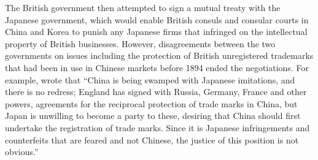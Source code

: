 \documentclass[12pt]{article}
\begin{document}
The British government then attempted to sign a mutual treaty with the Japanese government, which would enable British consuls and consular courts in China and Korea to punish any Japanese firms that infringed on the intellectual property of British businesses. However, disagreements between the two governments on issues including the protection of British unregistered trademarks that had been in use in Chinese markets before 1894 ended the negotiations. For example, \cite{PatentTrademarkReview1907} wrote that ``China is being swamped with Japanese imitations, and there is no redress; England has signed with Russia, Germany, France and other powers, agreements for the reciprocal protection of trade marks in China, but Japan is unwilling to become a party to these, desiring that China should first undertake the registration of trade marks. Since it is Japanese infringements and counterfeits that are feared and not Chinese, the justice of this position is not obvious.''
\begin{CJK*}{UTF8}{min}
\end{CJK*}
\end{document}
